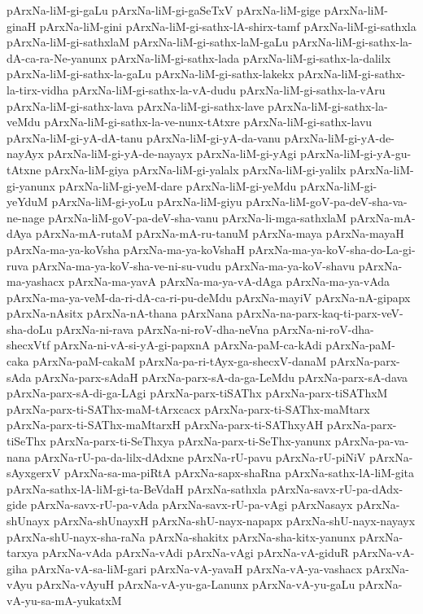 {pArxNa-liM-gi-gaLu
pArxNa-liM-gi-gaSeTxV
pArxNa-liM-gige
pArxNa-liM-ginaH
pArxNa-liM-gini
pArxNa-liM-gi-sathx-lA-shirx-tamf
pArxNa-liM-gi-sathxla
pArxNa-liM-gi-sathxlaM
pArxNa-liM-gi-sathx-laM-gaLu
pArxNa-liM-gi-sathx-la-dA-ca-ra-Ne-yanunx
pArxNa-liM-gi-sathx-lada
pArxNa-liM-gi-sathx-la-dalilx
pArxNa-liM-gi-sathx-la-gaLu
pArxNa-liM-gi-sathx-lakekx
pArxNa-liM-gi-sathx-la-tirx-vidha
pArxNa-liM-gi-sathx-la-vA-dudu
pArxNa-liM-gi-sathx-la-vAru
pArxNa-liM-gi-sathx-lava
pArxNa-liM-gi-sathx-lave
pArxNa-liM-gi-sathx-la-veMdu
pArxNa-liM-gi-sathx-la-ve-nunx-tAtxre
pArxNa-liM-gi-sathx-lavu
pArxNa-liM-gi-yA-dA-tanu
pArxNa-liM-gi-yA-da-vanu
pArxNa-liM-gi-yA-de-nayAyx
pArxNa-liM-gi-yA-de-nayayx
pArxNa-liM-gi-yAgi
pArxNa-liM-gi-yA-gu-tAtxne
pArxNa-liM-giya
pArxNa-liM-gi-yalalx
pArxNa-liM-gi-yalilx
pArxNa-liM-gi-yanunx
pArxNa-liM-gi-yeM-dare
pArxNa-liM-gi-yeMdu
pArxNa-liM-gi-yeYduM
pArxNa-liM-gi-yoLu
pArxNa-liM-giyu
pArxNa-liM-goV-pa-deV-sha-va-ne-nage
pArxNa-liM-goV-pa-deV-sha-vanu
pArxNa-li-mga-sathxlaM
pArxNa-mA-dAya
pArxNa-mA-rutaM
pArxNa-mA-ru-tanuM
pArxNa-maya
pArxNa-mayaH
pArxNa-ma-ya-koVsha
pArxNa-ma-ya-koVshaH
pArxNa-ma-ya-koV-sha-do-La-gi-ruva
pArxNa-ma-ya-koV-sha-ve-ni-su-vudu
pArxNa-ma-ya-koV-shavu
pArxNa-ma-yashacx
pArxNa-ma-yavA
pArxNa-ma-ya-vA-dAga
pArxNa-ma-ya-vAda
pArxNa-ma-ya-veM-da-ri-dA-ca-ri-pu-deMdu
pArxNa-mayiV
pArxNa-nA-gipapx
pArxNa-nAsitx
pArxNa-nA-thana
pArxNana
pArxNa-na-parx-kaq-ti-parx-veV-sha-doLu
pArxNa-ni-rava
pArxNa-ni-roV-dha-neVna
pArxNa-ni-roV-dha-shecxVtf
pArxNa-ni-vA-si-yA-gi-papxnA
pArxNa-paM-ca-kAdi
pArxNa-paM-caka
pArxNa-paM-cakaM
pArxNa-pa-ri-tAyx-ga-shecxV-danaM
pArxNa-parx-sAda
pArxNa-parx-sAdaH
pArxNa-parx-sA-da-ga-LeMdu
pArxNa-parx-sA-dava
pArxNa-parx-sA-di-ga-LAgi
pArxNa-parx-tiSAThx
pArxNa-parx-tiSAThxM
pArxNa-parx-ti-SAThx-maM-tArxcacx
pArxNa-parx-ti-SAThx-maMtarx
pArxNa-parx-ti-SAThx-maMtarxH
pArxNa-parx-ti-SAThxyAH
pArxNa-parx-tiSeThx
pArxNa-parx-ti-SeThxya
pArxNa-parx-ti-SeThx-yanunx
pArxNa-pa-va-nana
pArxNa-rU-pa-da-lilx-dAdxne
pArxNa-rU-pavu
pArxNa-rU-piNiV
pArxNa-sAyxgerxV
pArxNa-sa-ma-piRtA
pArxNa-sapx-shaRna
pArxNa-sathx-lA-liM-gita
pArxNa-sathx-lA-liM-gi-ta-BeVdaH
pArxNa-sathxla
pArxNa-savx-rU-pa-dAdx-gide
pArxNa-savx-rU-pa-vAda
pArxNa-savx-rU-pa-vAgi
pArxNasayx
pArxNa-shUnayx
pArxNa-shUnayxH
pArxNa-shU-nayx-napapx
pArxNa-shU-nayx-nayayx
pArxNa-shU-nayx-sha-raNa
pArxNa-shakitx
pArxNa-sha-kitx-yanunx
pArxNa-tarxya
pArxNa-vAda
pArxNa-vAdi
pArxNa-vAgi
pArxNa-vA-giduR
pArxNa-vA-giha
pArxNa-vA-sa-liM-gari
pArxNa-vA-yavaH
pArxNa-vA-ya-vashacx
pArxNa-vAyu
pArxNa-vAyuH
pArxNa-vA-yu-ga-Lanunx
pArxNa-vA-yu-gaLu
pArxNa-vA-yu-sa-mA-yukatxM
}
